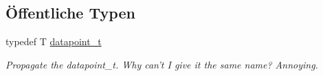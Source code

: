 \subsection*{Öffentliche Typen}
\begin{DoxyCompactItemize}
\item 
\hypertarget{classCDA_1_1FitMulticlassByEM_a4828ccd2a6a7e66211588ceabdce4d70}{
typedef T \hyperlink{classCDA_1_1FitMulticlassByEM_a4828ccd2a6a7e66211588ceabdce4d70}{datapoint\_\-t}}
\label{classCDA_1_1FitMulticlassByEM_a4828ccd2a6a7e66211588ceabdce4d70}

\begin{DoxyCompactList}\small\item\em Propagate the datapoint\_\-t. Why can't I give it the same name? Annoying. \item\end{DoxyCompactList}\end{DoxyCompactItemize}
